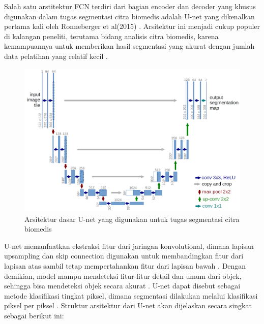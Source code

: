 \noindent Salah satu arstitektur FCN terdiri dari bagian encoder dan decoder yang khusus digunakan dalam tugas segmentasi citra biomedis adalah U-net yang dikenalkan pertama kali oleh Ronneberger et al(2015) \cite{ronneberger_u-net_2015}. Arsitektur ini menjadi cukup populer di kalangan peneliti, terutama bidang analisis citra biomedis, karena kemampuannya untuk memberikan hasil segmentasi yang akurat dengan jumlah data pelatihan yang relatif kecil \cite{williams_unified_2023}.

\begin{figure}[H]
	\centering
	\includegraphics[scale=.2]{gambar/U-net.png}
	\caption{Arsitektur dasar U-net yang digunakan untuk tugas segmentasi citra biomedis}
	\label{fig:U-net}
\end{figure}

\noindent U-net memanfaatkan ekstraksi fitur dari jaringan konvolutional, dimana lapisan upsampling dan skip connection digunakan untuk membandingkan fitur dari lapisan atas sambil tetap mempertahankan fitur dari lapisan bawah \cite{huang_fully_2022}. Dengan demikian, model mampu mendeteksi fitur-fitur detail dan umum dari objek, sehingga bisa mendeteksi objek secara akurat \cite{gonze}. U-net dapat disebut sebagai metode klasifikasi tingkat piksel, dimana segmentasi dilakukan melalui klasifikasi piksel per piksel \cite{siddique_u-net_2020}. Struktur arsitektur dari U-net akan dijelaskan secara singkat sebagai berikut ini:

